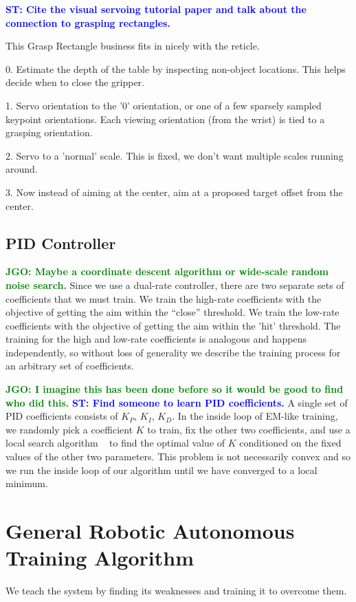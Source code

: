 \documentclass[conference]{IEEEtran}
\newcommand{\stnote}[1]{\textcolor{Blue}{\textbf{ST: #1}}}
\newcommand{\jgonote}[1]{\textcolor{Green}{\textbf{JGO: #1}}}
\begin{document}
\stnote{Cite the visual servoing tutorial paper and talk about the
  connection to grasping rectangles.}

This Grasp Rectangle business fits in nicely with the reticle.

0. Estimate the depth of the table by inspecting non-object locations. This helps decide when to close the gripper.

1. Servo orientation to the '0' orientation, or one of a few sparsely sampled keypoint orientations.
Each viewing orientation (from the wrist) is tied to a grasping orientation.

2. Servo to a 'normal' scale. This is fixed, we don't want multiple scales running around.

3. Now instead of aiming at the center, aim at a proposed target offset from the center.


\subsection{PID Controller}
\jgonote{Maybe a coordinate descent algorithm or wide-scale random noise search.}
Since we use a dual-rate controller, there are two separate sets of coefficients that we must train.
We train the high-rate coefficients with the objective of getting the aim within the ``close'' threshold.
We train the low-rate coefficients with the objective of getting the aim within the 'hit' threshold.
The training for the high and low-rate coefficients is analogous and happens independently, so
without loss of generality we describe the training process for an arbitrary set of coefficients.

\jgonote{I imagine this has been done before so it would be good to find who did this.}
\stnote{Find someone to learn PID coefficients.}
A single set of PID coefficients consists of $K_P$, $K_I$, $K_D$. In the inside loop of EM-like training, we
randomly pick a coefficient $K$ to train, fix the other two coefficients,  and use a local search 
algorithm ~\citep{} to find the optimal value of $K$ conditioned on the fixed values of the other two
parameters. This problem is not necessarily convex and so we run the inside loop of our algorithm
until we have converged to a local minimum.

\section{General Robotic Autonomous Training Algorithm}
\label{sec:training}
We teach the system by finding its weaknesses and training it to overcome them.
\end{document}

